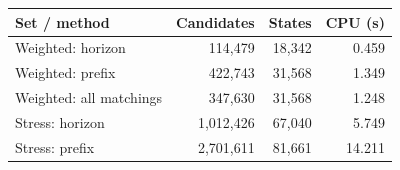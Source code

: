 \begin{tabular}{lrrr}
\toprule Set / method & Candidates & States & CPU (s) \\
\midrule
Weighted: horizon & 114,479 & 18,342 & 0.459 \\
Weighted: prefix & 422,743 & 31,568 & 1.349 \\
Weighted: all matchings & 347,630 & 31,568 & 1.248 \\
\midrule
Stress: horizon & 1,012,426 & 67,040 & 5.749 \\
Stress: prefix & 2,701,611 & 81,661 & 14.211 \\
\bottomrule
\end{tabular}
